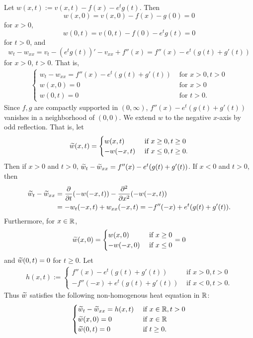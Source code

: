 Let $w(x, t) := v(x, t) - f(x) - e^{t}g(t)$. Then
$$w(x, 0) = v(x, 0) - f(x) - g(0) = 0$$
for $x > 0$, $$w(0, t) = v(0, t) - f(0) - e^{t}g(t) = 0$$ for $t > 0$, and
$$w_{t} - w_{xx} = v_{t} - (e^{t}g(t))' - v_{xx} + f''(x) = f''(x) - e^{t}(g(t) + g'(t))$$
for $x > 0$, $t > 0$.
That is,
\begin{align*}
\begin{cases}
w_{t} - w_{xx} = f''(x) - e^{t}(g(t) + g'(t)) & \text{ for } x > 0, t > 0\\
w(x, 0) = 0 & \text{ for } x > 0\\
w(0, t) = 0 & \text{ for } t > 0.
\end{cases}
\end{align*}
Since $f, g$ are compactly supported in $(0, \infty)$, $f''(x) - e^{t}(g(t) + g'(t))$ vanishes
in a neighborhood of $(0, 0)$. We extend $w$ to the negative $x$-axis by odd reflection.
That is, let
\begin{align*}
\widetilde{w}(x, t) =
\begin{cases}
w(x, t) & \text{ if } x \geq 0, t \geq 0\\
-w(-x, t) & \text{ if } x \leq 0, t \geq 0.
\end{cases}
\end{align*}
Then if $x > 0$ and $t > 0$,
$\widetilde{w}_{t} - \widetilde{w}_{xx} = f''(x) - e^{t}(g(t) + g'(t))$. If $x < 0$ and $t > 0$, then
\begin{align*}
\widetilde{w}_{t} - \widetilde{w}_{xx} &= \frac{\partial}{\partial t}(-w(-x, t)) - \frac{\partial^{2}}{\partial x^{2}}(-w(-x, t))\\
& = -w_{t}(-x, t) + w_{xx}(-x, t) = -f''(-x) + e^{t}(g(t) + g'(t)).
\end{align*}
Furthermore, for $x \in \mathbb{R}$,
\begin{align*}
\widetilde{w}(x, 0) =
\begin{cases}
w(x, 0) & \text{ if } x \geq 0\\
-w(-x, 0) & \text{ if } x \leq 0
\end{cases} = 0
\end{align*}
and $\widetilde{w}(0, t) = 0$ for $t \geq 0$.
Let
\begin{align*}
h(x, t) :=
\begin{cases}
f''(x) - e^{t}(g(t) + g'(t)) & \text{ if } x > 0, t > 0\\
-f''(-x) + e^{t}(g(t) + g'(t)) & \text{ if } x < 0, t > 0.
\end{cases}
\end{align*}
Thus $\widetilde{w}$ satisfies the following non-homogenous heat equation in $\mathbb{R}$:
\begin{align*}
\begin{cases}
\widetilde{w}_{t} - \widetilde{w}_{xx} =h(x, t) & \text{ if } x \in \mathbb{R}, t > 0\\
\widetilde{w}(x, 0) = 0 & \text{ if } x \in \mathbb{R}\\
\widetilde{w}(0, t) = 0 & \text{ if } t \geq 0.
\end{cases}
\end{align*}
